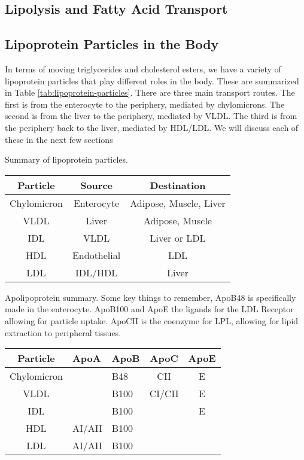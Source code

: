 \documentclass{tufte-handout}
\begin{document}
\subsection{Lipolysis and Fatty Acid Transport}


\subsection{Lipoprotein Particles in the Body}

In terms of moving triglycerides and cholesterol esters, we have a variety of lipoprotein particles that play different roles in the body.  These are summarized in Table \ref{tab:lipoprotein-particles}.  There are three main transport routes.  The first is from the enterocyte to the periphery, mediated by chylomicrons.  The second is from the liver to the periphery, mediated by VLDL.  The third is from the periphery back to the liver, mediated by HDL/LDL.  We will discuss each of these in the next few sections

\begin{margintable}
\centering
\caption{Summary of lipoprotein particles.}
\label{tab:lipoprotein-particles}
\begin{tabular}{@{}ccc@{}}
\toprule
\textbf{Particle} & \textbf{Source} & \textbf{Destination}       \\ \midrule
Chylomicron       & Enterocyte      & Adipose, Muscle, Liver \\
VLDL              & Liver           & Adipose, Muscle            \\
IDL                 & VLDL          & Liver or LDL \\
HDL               & Endothelial     & LDL                        \\
LDL               & IDL/HDL             & Liver                      \\ \bottomrule
\end{tabular}
\end{margintable}


\begin{margintable}
\centering
\caption{Apolipoprotein summary.  Some key things to remember, ApoB48 is specifically made in the enterocyte.  ApoB100 and ApoE the ligands for the LDL Receptor allowing for particle uptake.  ApoCII is the coenzyme for LPL, allowing for lipid extraction to peripheral tissues.}
\label{tab:apolipoproteins}
\begin{tabular}{@{}cllcc@{}}
\toprule
\textbf{Particle} & \textbf{ApoA} & \textbf{ApoB} & \textbf{ApoC} & \textbf{ApoE} \\ \midrule
Chylomicron       &               & B48           & CII           & E             \\
VLDL              &               & B100          & CI/CII        & E             \\
IDL               &                  & B100         &        &   E \\
HDL               & AI/AII          & B100          &               &               \\
LDL               & AI/AII         & B100          &               &              
\end{tabular}
\end{margintable}
\end{document}
